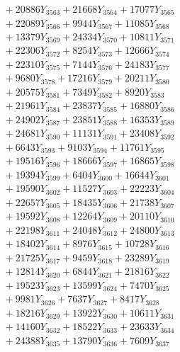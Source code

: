 \documentclass[a4paper,10pt]{article}
\begin{document}
{\begin{align}
&\;  + 20886 Y_{3563} + 21668 Y_{3564} + 17077 Y_{3565} \\[0.3ex]
&\;  + 22089 Y_{3566} + 9944 Y_{3567} + 11085 Y_{3568} \\[0.5ex]\allowbreak
&\;  + 13379 Y_{3569} + 24334 Y_{3570} + 10811 Y_{3571} \\[0.3ex]
&\;  + 22306 Y_{3572} + 8254 Y_{3573} + 12666 Y_{3574} \\[0.3ex]
&\;  + 22310 Y_{3575} + 7144 Y_{3576} + 24183 Y_{3577} \\[0.3ex]
&\;  + 9680 Y_{3578} + 17216 Y_{3579} + 20211 Y_{3580} \\[0.3ex]
&\;  + 20575 Y_{3581} + 7349 Y_{3582} + 8920 Y_{3583} \\[0.3ex]
&\;  + 21961 Y_{3584} + 23837 Y_{3585} + 16880 Y_{3586} \\[0.3ex]
&\;  + 24902 Y_{3587} + 23851 Y_{3588} + 16353 Y_{3589} \\[0.3ex]
&\;  + 24681 Y_{3590} + 11131 Y_{3591} + 23408 Y_{3592} \\[0.3ex]
&\;  + 6643 Y_{3593} + 9103 Y_{3594} + 11761 Y_{3595} \\[0.3ex]
&\;  + 19516 Y_{3596} + 18666 Y_{3597} + 16865 Y_{3598} \\[0.5ex]\allowbreak
&\;  + 19394 Y_{3599} + 6404 Y_{3600} + 16644 Y_{3601} \\[0.3ex]
&\;  + 19590 Y_{3602} + 11527 Y_{3603} + 22223 Y_{3604} \\[0.3ex]
&\;  + 22657 Y_{3605} + 18435 Y_{3606} + 21738 Y_{3607} \\[0.3ex]
&\;  + 19592 Y_{3608} + 12264 Y_{3609} + 20110 Y_{3610} \\[0.3ex]
&\;  + 22198 Y_{3611} + 24048 Y_{3612} + 24800 Y_{3613} \\[0.3ex]
&\;  + 18402 Y_{3614} + 8976 Y_{3615} + 10728 Y_{3616} \\[0.3ex]
&\;  + 21725 Y_{3617} + 9459 Y_{3618} + 23289 Y_{3619} \\[0.3ex]
&\;  + 12814 Y_{3620} + 6844 Y_{3621} + 21816 Y_{3622} \\[0.3ex]
&\;  + 19523 Y_{3623} + 13599 Y_{3624} + 7470 Y_{3625} \\[0.3ex]
&\;  + 9981 Y_{3626} + 7637 Y_{3627} + 8417 Y_{3628} \\[0.5ex]\allowbreak
&\;  + 18216 Y_{3629} + 13922 Y_{3630} + 10611 Y_{3631} \\[0.3ex]
&\;  + 14160 Y_{3632} + 18522 Y_{3633} + 23633 Y_{3634} \\[0.3ex]
&\;  + 24388 Y_{3635} + 13790 Y_{3636} + 7609 Y_{3637} \\[0.3ex]

\end{align}}
\end{document}
